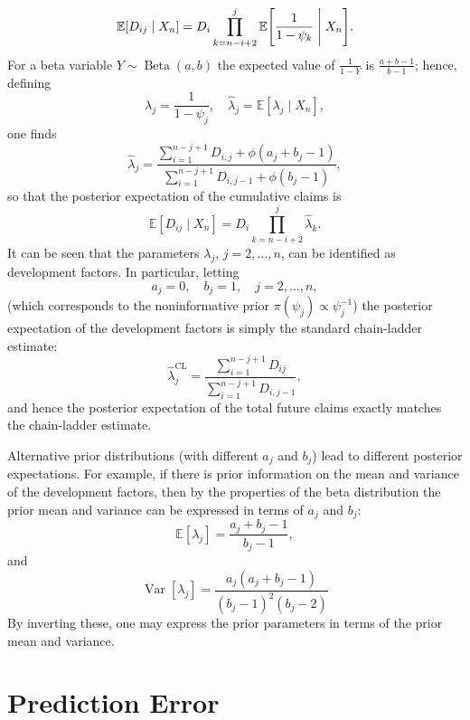 \documentclass[aps,pre,draft]{revtex4-2}
\begin{document}
\begin{equation}\label{eq:expected_cum_final}
\mathbb{E}[D_{ij}\mid X_n]=D_i\prod_{k=n-i+2}^{j}\mathbb{E}\Biggl[\frac{1}{1-\psi_k}\Biggm| X_n\Biggr].
\end{equation}
For a beta variable $Y\sim \operatorname{Beta}(a,b)$ the expected value of $\frac{1}{1-Y}$ is $\frac{a+b-1}{b-1}$; hence, defining
\[
\lambda_j=\frac{1}{1-\psi_j},\quad \hat{\lambda}_j=\mathbb{E}[\lambda_j\mid X_n],
\]
one finds
\begin{equation}\label{eq:lambda_hat}
\hat{\lambda}_j=\frac{\sum_{i=1}^{n-j+1}D_{i,j}+\phi(a_j+b_j-1)}{\sum_{i=1}^{n-j+1}D_{i,j-1}+\phi(b_j-1)},
\end{equation}
so that the posterior expectation of the cumulative claims is
\begin{equation}\label{eq:expected_final}
\mathbb{E}[D_{ij}\mid X_n]=D_i\prod_{k=n-i+2}^{j}\hat{\lambda}_k.
\end{equation}
It can be seen that the parameters $\lambda_j$, $j=2,\dots,n$, can be identified as development factors. In particular, letting 
\[
a_j=0,\quad b_j=1,\quad j=2,\dots,n,
\]
(which corresponds to the noninformative prior $\pi(\psi_j)\propto\psi_j^{-1}$) the posterior expectation of the development factors is simply the standard chain-ladder estimate:
\begin{equation}\label{eq:chain_ladder}
\hat{\lambda}^{\text{CL}}_j=\frac{\sum_{i=1}^{n-j+1}D_{ij}}{\sum_{i=1}^{n-j+1}D_{i,j-1}},
\end{equation}
and hence the posterior expectation of the total future claims exactly matches the chain-ladder estimate.

Alternative prior distributions (with different $a_j$ and $b_j$) lead to different posterior expectations. For example, if there is prior information on the mean and variance of the development factors, then by the properties of the beta distribution the prior mean and variance can be expressed in terms of $a_j$ and $b_j$:
\begin{equation}\label{eq:prior_mean}
\mathbb{E}[\lambda_j]=\frac{a_j+b_j-1}{b_j-1},
\end{equation}
and
\begin{equation}\label{eq:prior_var}
\operatorname{Var}[\lambda_j]=\frac{a_j(a_j+b_j-1)}{(b_j-1)^2(b_j-2)}
\end{equation}
By inverting these, one may express the prior parameters in terms of the prior mean and variance.

\section{Prediction Error}
\end{document}
